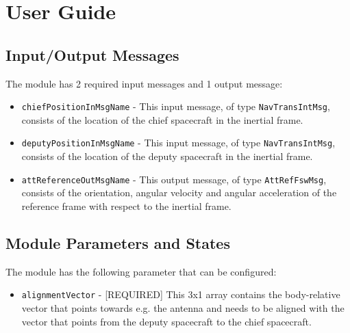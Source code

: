 
\section{User Guide}

\subsection{Input/Output Messages}

The module has 2 required input messages and 1 output message:

\begin{itemize}
    \item {\tt chiefPositionInMsgName} - This input message, of type {\tt NavTransIntMsg}, consists of the location of the chief spacecraft in the inertial frame.
    \item {\tt deputyPositionInMsgName} - This input message, of type {\tt NavTransIntMsg}, consists of the location of the deputy spacecraft in the inertial frame.
    \item {\tt attReferenceOutMsgName} - This output message, of type {\tt AttRefFswMsg}, consists of the orientation, angular velocity and angular acceleration of the reference frame with respect to the inertial frame.
\end{itemize}

\subsection{Module Parameters and States}

The module has the following parameter that can be configured:

\begin{itemize}
    \item {\tt alignmentVector} - [REQUIRED] This 3x1 array contains the body-relative vector that points towards e.g. the antenna and needs to be aligned with the vector that points from the deputy spacecraft to the chief spacecraft.
\end{itemize}

